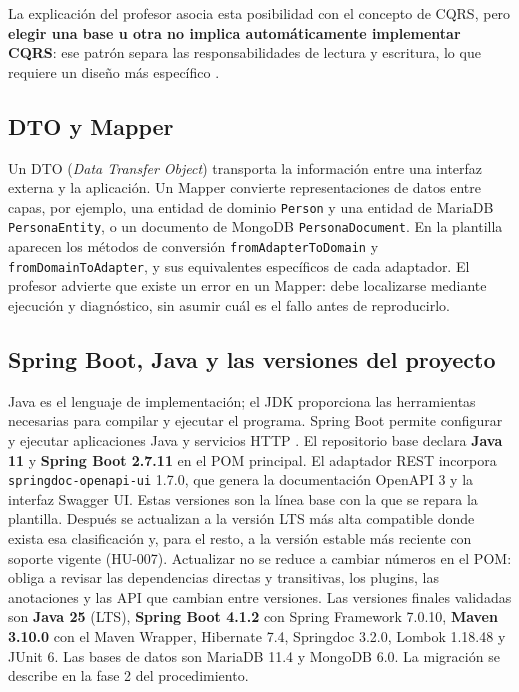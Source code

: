 \documentclass[11pt,a4paper]{article}
\begin{document}
La explicación del profesor asocia esta posibilidad con el concepto de CQRS,
pero \textbf{elegir una base u otra no implica automáticamente implementar CQRS}:
ese patrón separa las responsabilidades de lectura y escritura, lo que requiere
un diseño más específico \cite{fowler}.

\subsection{DTO y Mapper}
Un DTO (\emph{Data Transfer Object}) transporta la información entre una
interfaz externa y la aplicación. Un Mapper convierte representaciones de
datos entre capas, por ejemplo, una entidad de dominio \texttt{Person} y una
entidad de MariaDB \texttt{PersonaEntity}, o un documento de MongoDB
\texttt{PersonaDocument}. En la plantilla aparecen los métodos de conversión
\texttt{fromAdapterToDomain} y \texttt{fromDomainToAdapter}, y sus equivalentes
específicos de cada adaptador. El profesor advierte que existe un error en un
Mapper: debe localizarse mediante ejecución y diagnóstico, sin asumir cuál
es el fallo antes de reproducirlo.

\subsection{Spring Boot, Java y las versiones del proyecto}
Java es el lenguaje de implementación; el JDK proporciona las herramientas
necesarias para compilar y ejecutar el programa. Spring Boot permite configurar
y ejecutar aplicaciones Java y servicios HTTP \cite{spring}. El repositorio
base declara \textbf{Java 11} y \textbf{Spring Boot 2.7.11} en el POM principal.
El adaptador REST incorpora \texttt{springdoc-openapi-ui} 1.7.0, que genera la
documentación OpenAPI 3 y la interfaz Swagger UI. Estas versiones son la línea
base con la que se repara la plantilla. Después se actualizan a la versión LTS
más alta compatible donde exista esa clasificación y, para el resto, a la versión
estable más reciente con soporte vigente (HU-007). Actualizar no se reduce a
cambiar números en el POM: obliga a revisar las dependencias directas y
transitivas, los plugins, las anotaciones y las API que cambian entre versiones.
Las versiones finales validadas son \textbf{Java 25} (LTS), \textbf{Spring Boot
4.1.2} con Spring Framework 7.0.10, \textbf{Maven 3.10.0} con el Maven Wrapper,
Hibernate 7.4, Springdoc 3.2.0, Lombok 1.18.48 y JUnit 6. Las bases de datos son
MariaDB 11.4 y MongoDB 6.0. La migración se describe en la fase 2 del
procedimiento.
\end{document}

